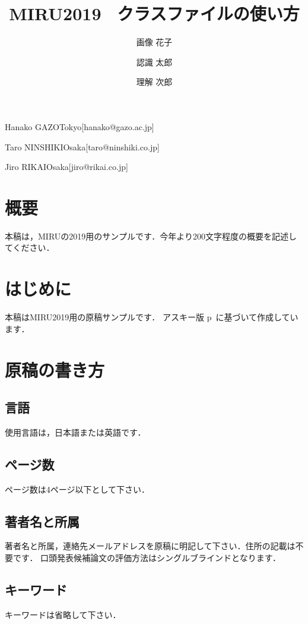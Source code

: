 \documentclass[MIRU,submit]{miru2019j}
\begin{document}
\title{MIRU2019 \LaTeXe\ クラスファイルの使い方}


 \author{画像 花子}{Hanako GAZO}{Tokyo}[hanako@gazo.ac.jp]
 \author{認識 太郎}{Taro NINSHIKI}{Osaka}[taro@ninshiki.co.jp]
 \author{理解 次郎}{Jiro RIKAI}{Osaka}[jiro@rikai.co.jp]

\maketitle

\section*{概要}
本稿は，MIRUの2019用のサンプルです．今年より200文字程度の概要を記述してください．

\section{はじめに}
本稿はMIRU2019用の原稿サンプルです．
アスキー版 p\LaTeXe\ に基づいて作成しています．

\section{原稿の書き方}

\subsection{言語}
使用言語は，日本語または英語です．

\subsection{ページ数}
ページ数は4ページ以下として下さい．

\subsection{著者名と所属}
著者名と所属，連絡先メールアドレスを原稿に明記して下さい．住所の記載は不要です．
口頭発表候補論文の評価方法はシングルブラインドとなります．

\subsection{キーワード}
キーワードは省略して下さい．
\end{document}

